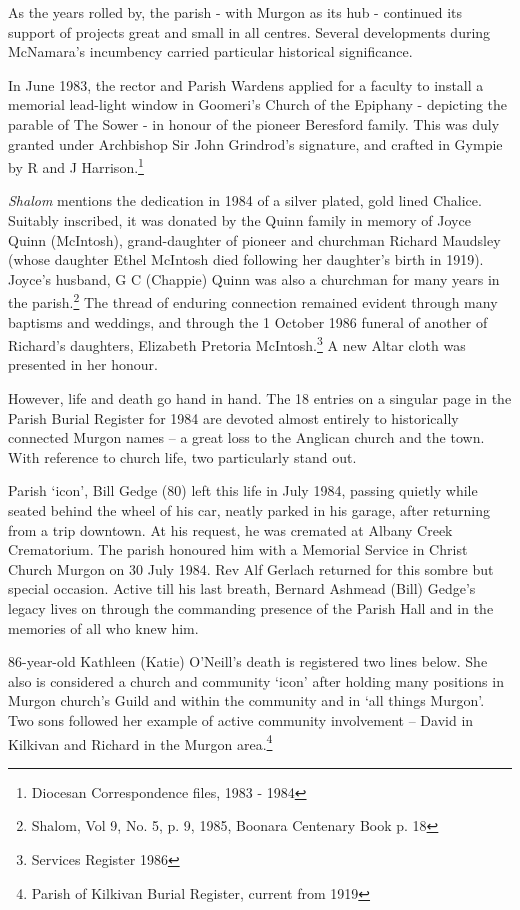 As the years rolled by, the parish - with Murgon as its hub - continued its support of projects great and small in all centres. Several developments during McNamara's incumbency carried particular historical significance.

In June 1983, the rector and Parish Wardens applied for a faculty to install a memorial lead-light window in Goomeri's Church of the Epiphany - depicting the parable of The Sower - in honour of the pioneer Beresford family. This was duly granted under Archbishop Sir John Grindrod's signature, and crafted in Gympie by R and J Harrison.\footnote{Diocesan Correspondence files, 1983 - 1984}

\emph{Shalom} mentions the dedication in 1984 of a silver plated, gold lined Chalice. Suitably inscribed, it was donated by the Quinn family in memory of Joyce Quinn (McIntosh), grand-daughter of pioneer and churchman Richard Maudsley (whose daughter Ethel McIntosh died following her daughter's birth in 1919). Joyce's husband, G C (Chappie) Quinn was also a churchman for many years in the parish.\footnote{Shalom, Vol 9, No. 5, p. 9, 1985, Boonara Centenary Book p. 18} The thread of enduring connection remained evident through many baptisms and weddings, and through the 1 October 1986 funeral of another of Richard's daughters, Elizabeth Pretoria McIntosh.\footnote{Services Register 1986} A new Altar cloth was presented in her honour.

However, life and death go hand in hand. The 18 entries on a singular page in the Parish Burial Register for 1984 are devoted almost entirely to historically connected Murgon names -- a great loss to the Anglican church and the town. With reference to church life, two particularly stand out.

Parish `icon', Bill Gedge (80) left this life in July 1984, passing quietly while seated behind the wheel of his car, neatly parked in his garage, after returning from a trip downtown. At his request, he was cremated at Albany Creek Crematorium. The parish honoured him with a Memorial Service in Christ Church Murgon on 30 July 1984. Rev Alf Gerlach returned for this sombre but special occasion. Active till his last breath, Bernard Ashmead (Bill) Gedge's legacy lives on through the commanding presence of the Parish Hall and in the memories of all who knew him.

86-year-old Kathleen (Katie) O'Neill's death is registered two lines below. She also is considered a church and community `icon' after holding many positions in Murgon church's Guild and within the community and in `all things Murgon'. Two sons followed her example of active community involvement -- David in Kilkivan and Richard in the Murgon area.\footnote{Parish of Kilkivan Burial Register, current from 1919}


